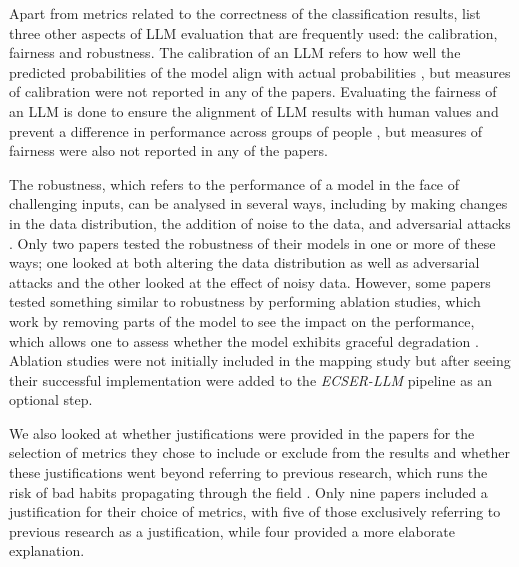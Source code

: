 \documentclass[a4paper]{article}
\newcommand{\newecser}{\textit{ECSER-LLM} }
\begin{document}
Apart from metrics related to the correctness of the classification results, \textcite{chang2023} list three other aspects of LLM evaluation that are frequently used: the calibration, fairness and robustness. The calibration of an LLM refers to how well the predicted probabilities of the model align with actual probabilities \cite{nixon2019calibration,guo2017calibration}, but measures of calibration were not reported in any of the papers. Evaluating the fairness of an LLM is done to ensure the alignment of LLM results with human values and prevent a difference in performance across groups of people \cite{liu2024}, but measures of fairness were also not reported in any of the papers. 

The robustness, which refers to the performance of a model in the face of challenging inputs, can be analysed in several ways, including by making changes in the data distribution, the addition of noise to the data, and adversarial attacks \cite{chang2023}. Only two papers tested the robustness of their models in one or more of these ways; one looked at both altering the data distribution as well as adversarial attacks and the other looked at the effect of noisy data. However, some papers tested something similar to robustness by performing ablation studies, which work by removing parts of the model to see the impact on the performance, which allows one to assess whether the model exhibits graceful degradation \cite{meyes2019ablation}. Ablation studies were not initially included in the mapping study but after seeing their successful implementation were added to the \newecser pipeline as an optional step.


We also looked at whether justifications were provided in the papers for the selection of metrics they chose to include or exclude from the results and whether these justifications went beyond referring to previous research, which runs the risk of bad habits propagating through the field \cite{Dellanna2022}. Only nine papers included a justification for their choice of metrics, with five of those exclusively referring to previous research as a justification, while four provided a more elaborate explanation.
\end{document}
